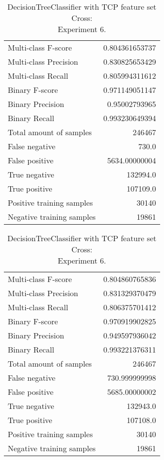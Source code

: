 \begin{table}[H]
\begin{minipage}{0.5\textwidth}
\caption{DecisionTreeClassifier with TCP feature set Cross: \\Experiment 5.}
\centering
\begin{tabular}{l r}
\toprule
Multi-class F-score & 0.804361653737 \\
Multi-class Precision & 0.830825653429 \\
Multi-class Recall & 0.805994311612 \\
\midrule
Binary F-score & 0.971149051147 \\
Binary Precision & 0.95002793965 \\
Binary Recall & 0.993230649394 \\
\midrule
Total amount of samples & 246467 \\
False negative & 730.0 \\
False positive & 5634.00000004 \\
True negative & 132994.0 \\
True positive & 107109.0 \\
\midrule
Positive training samples & 30140 \\
Negative training samples & 19861 \\
\bottomrule
\end{tabular}
\end{minipage}
\hfillx
\begin{minipage}{0.5\textwidth}
\caption{DecisionTreeClassifier with TCP feature set Cross: \\Experiment 6.}
\centering
\begin{tabular}{l r}
\toprule
Multi-class F-score & 0.804860765836 \\
Multi-class Precision & 0.831329370479 \\
Multi-class Recall & 0.806375701412 \\
\midrule
Binary F-score & 0.970919902825 \\
Binary Precision & 0.949597936042 \\
Binary Recall & 0.993221376311 \\
\midrule
Total amount of samples & 246467 \\
False negative & 730.999999998 \\
False positive & 5685.00000002 \\
True negative & 132943.0 \\
True positive & 107108.0 \\
\midrule
Positive training samples & 30140 \\
Negative training samples & 19861 \\
\bottomrule
\end{tabular}
\end{minipage}
\end{table}
